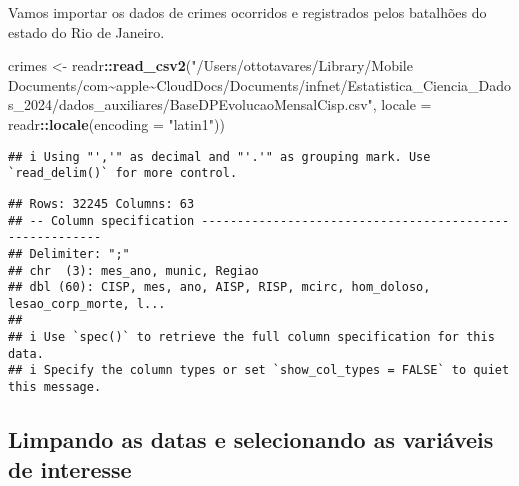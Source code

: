 \documentclass[
]{article}
\newenvironment{Shaded}{\begin{snugshade}}{\end{snugshade}}
\newcommand{\AttributeTok}[1]{\textcolor[rgb]{0.13,0.29,0.53}{#1}}
\newcommand{\FunctionTok}[1]{\textcolor[rgb]{0.13,0.29,0.53}{\textbf{#1}}}
\newcommand{\NormalTok}[1]{#1}
\newcommand{\OtherTok}[1]{\textcolor[rgb]{0.56,0.35,0.01}{#1}}
\newcommand{\SpecialCharTok}[1]{\textcolor[rgb]{0.81,0.36,0.00}{\textbf{#1}}}
\newcommand{\StringTok}[1]{\textcolor[rgb]{0.31,0.60,0.02}{#1}}
\begin{document}
Vamos importar os dados de crimes ocorridos e registrados pelos
batalhões do estado do Rio de Janeiro.

\begin{Shaded}
\begin{Highlighting}[]
\NormalTok{crimes }\OtherTok{\textless{}{-}}\NormalTok{ readr}\SpecialCharTok{::}\FunctionTok{read\_csv2}\NormalTok{(}\StringTok{"/Users/ottotavares/Library/Mobile Documents/com\textasciitilde{}apple\textasciitilde{}CloudDocs/Documents/infnet/Estatistica\_Ciencia\_Dados\_2024/dados\_auxiliares/BaseDPEvolucaoMensalCisp.csv"}\NormalTok{, }\AttributeTok{locale =}\NormalTok{ readr}\SpecialCharTok{::}\FunctionTok{locale}\NormalTok{(}\AttributeTok{encoding =} \StringTok{"latin1"}\NormalTok{))}
\end{Highlighting}
\end{Shaded}

\begin{verbatim}
## i Using "','" as decimal and "'.'" as grouping mark. Use `read_delim()` for more control.
\end{verbatim}

\begin{verbatim}
## Rows: 32245 Columns: 63
## -- Column specification --------------------------------------------------------
## Delimiter: ";"
## chr  (3): mes_ano, munic, Regiao
## dbl (60): CISP, mes, ano, AISP, RISP, mcirc, hom_doloso, lesao_corp_morte, l...
## 
## i Use `spec()` to retrieve the full column specification for this data.
## i Specify the column types or set `show_col_types = FALSE` to quiet this message.
\end{verbatim}

\subsection{Limpando as datas e selecionando as variáveis de
interesse}\label{limpando-as-datas-e-selecionando-as-variuxe1veis-de-interesse}
\end{document}
